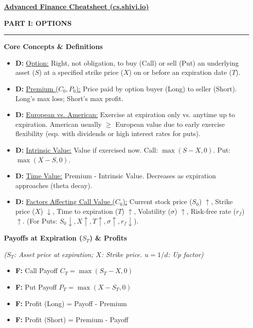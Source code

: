 \documentclass[7pt,landscape]{extarticle} %
\newcommand{\cheatsheetsection}[1]{%
  \vspace{0.25ex plus 0.1ex minus 0.05ex}%
  \noindent\color{SecTitleColor}\textbf{\sffamily\small\MakeUppercase{#1}}%
  \par\vspace{0.02ex}%
  {\color{RuleColor}\hrule height 0.3pt}\par\vspace{0.15ex}%
}
\newcommand{\cheatsheetsubsubsection}[1]{%
  \vspace{0.15ex plus 0.05ex minus 0.05ex}%
  \noindent\textbf{\sffamily\scriptsize #1}%
  \par\vspace{0.05ex}%
}
\newcommand{\D}[1]{\textbf{\textcolor{DefColor}{D:}} \uline{#1}}
\newcommand{\F}[1]{\textbf{\textcolor{FormColor}{F:}} #1}
\newcommand{\SF}[1]{\textit{\small (#1)}} %
\begin{document}
\renewcommand{\small}{\fontsize{8pt}{8pt}\selectfont} %
\small %

\begin{multicols*}{4} %
  \RaggedRight %

  \noindent\textbf{\underline{\sffamily Advanced Finance Cheatsheet (cs.shivi.io)}} %
  \vspace{0.1ex} %

  \cheatsheetsection{Part I: Options}
  
  \cheatsheetsubsubsection{Core Concepts \& Definitions}
  \begin{itemize}
    \item \D{Option:} Right, not obligation, to buy (Call) or sell (Put) an underlying asset ($S$) at a specified strike price ($X$) on or before an expiration date ($T$).
    \item \D{Premium ($C_0, P_0$):} Price paid by option buyer (Long) to seller (Short). Long's max loss; Short's max profit.
    \item \D{European vs. American:} Exercise at expiration only vs. anytime up to expiration. American usually $\ge$ European value due to early exercise flexibility (esp. with dividends or high interest rates for puts).
    \item \D{Intrinsic Value:} Value if exercised now. Call: $\max(S-X,0)$. Put: $\max(X-S,0)$.
    \item \D{Time Value:} Premium - Intrinsic Value. Decreases as expiration approaches (theta decay).
    \item \D{Factors Affecting Call Value ($C_0$):} Current stock price ($S_0$) $\uparrow$, Strike price ($X$) $\downarrow$, Time to expiration ($T$) $\uparrow$, Volatility ($\sigma$) $\uparrow$, Risk-free rate ($r_f$) $\uparrow$. (For Puts: $S_0 \downarrow, X \uparrow, T \uparrow, \sigma \uparrow, r_f \downarrow$).
  \end{itemize}
  
  \cheatsheetsubsubsection{Payoffs at Expiration ($S_T$) \& Profits}
  \SF{$S_T$: Asset price at expiration; $X$: Strike price. $u = 1/d$: Up factor}
  \begin{itemize}
    \item \F{Call Payoff $C_T = \max(S_T - X, 0)$}
    \item \F{Put Payoff $P_T = \max(X - S_T, 0)$}
    \item \F{Profit (Long) = Payoff - Premium}
    \item \F{Profit (Short) = Premium - Payoff}
  \end{itemize}
  

\end{multicols*}
\end{document}

